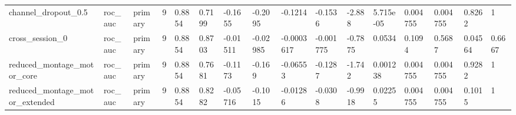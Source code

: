 \begin{tabular}{llllllllllllllll}
channel\_dropout\_0.5 & roc\_auc & primary & 9 & 0.8854 & 0.7199 & -0.1655 & -0.2095 & -0.1214 & -0.1536 & -2.888 & 5.715e-05 & 0.004755 & 0.004755 & 0.8262 & 1 \\
cross\_session\_0 & roc\_auc & primary & 9 & 0.8854 & 0.8703 & -0.01511 & -0.02985 & -0.0003617 & -0.001775 & -0.7875 & 0.0534 & 0.1094 & 0.5687 & 0.04564 & 0.6667 \\
reduced\_montage\_motor\_core & roc\_auc & primary & 9 & 0.8854 & 0.7681 & -0.1173 & -0.169 & -0.06553 & -0.1287 & -1.742 & 0.001238 & 0.004755 & 0.004755 & 0.9282 & 1 \\
reduced\_montage\_motor\_extended & roc\_auc & primary & 9 & 0.8854 & 0.8282 & -0.05716 & -0.1015 & -0.01286 & -0.0308 & -0.9918 & 0.02255 & 0.004755 & 0.004755 & 0.1015 & 1 \\
\bottomrule
\end{tabular}
